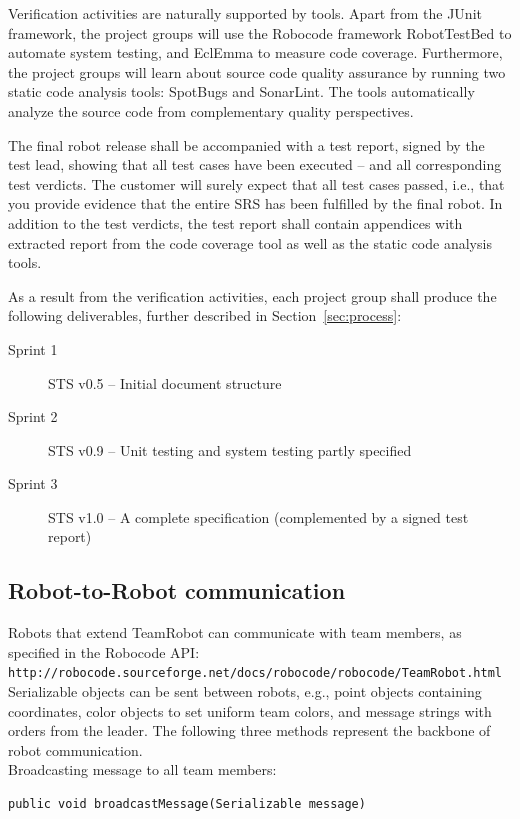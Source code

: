 \documentclass{scrreprt}
\begin{document}
Verification activities are naturally supported by tools. Apart from the JUnit framework, the project groups will use the Robocode framework RobotTestBed to automate system testing, and EclEmma to measure code coverage. Furthermore, the project groups will learn about source code quality assurance by running two static code analysis tools: SpotBugs and SonarLint. The tools automatically analyze the source code from complementary quality perspectives.

The final robot release shall be accompanied with a test report, signed by the test lead, showing that all test cases have been executed -- and all corresponding test verdicts. The customer will surely expect that all test cases passed, i.e., that you provide evidence that the entire SRS has been fulfilled by the final robot. In addition to the test verdicts, the test report shall contain appendices with extracted report from the code coverage tool as well as the static code analysis tools.

As a result from the verification activities, each project group shall produce the following deliverables, further described in Section~\ref{sec:process}:
\begin{description}
\item[Sprint 1] STS v0.5 -- Initial document structure
\item[Sprint 2] STS v0.9 -- Unit testing and system testing partly specified
\item[Sprint 3] STS v1.0 -- A complete specification (complemented by a signed test report)
\end{description}

\subsection{Robot-to-Robot communication}
Robots that extend TeamRobot can communicate with team members, as specified in the Robocode API: \texttt{http://robocode.sourceforge.net/docs/robocode/robocode/TeamRobot.html} Serializable objects can be sent between robots, e.g., point objects containing coordinates, color objects to set uniform team colors, and message strings with orders from the leader. The following three methods represent the backbone of robot communication.\\

Broadcasting message to all team members:
\begin{verbatim}
public void broadcastMessage(Serializable message)
\end{verbatim}
\end{document}
